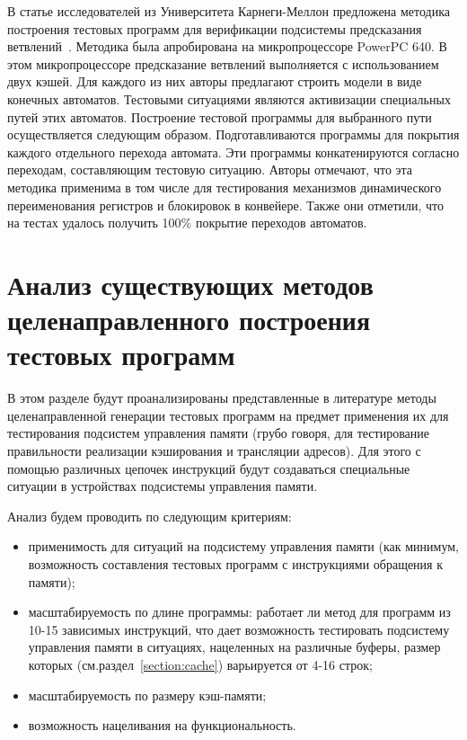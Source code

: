 В статье исследователей из Университета Карнеги-Меллон предложена методика построения тестовых программ для верификации подсистемы предсказания ветвлений~\cite{Branches99}. Методика была апробирована на микропроцессоре PowerPC 640. В этом микропроцессоре предсказание ветвлений выполняется с использованием двух кэшей. Для каждого из них авторы предлагают строить модели в виде конечных автоматов. Тестовыми ситуациями являются активизации специальных путей этих автоматов. Построение тестовой программы для выбранного пути осуществляется следующим образом. Подготавливаются программы для покрытия каждого отдельного перехода автомата. Эти программы конкатенируются согласно переходам, составляющим тестовую ситуацию. Авторы отмечают, что эта методика применима в том числе для тестирования механизмов динамического переименования регистров и блокировок в конвейере. Также они отметили, что на тестах удалось получить 100\% покрытие переходов автоматов.


\section{Анализ существующих методов целенаправленного построения  тестовых программ}

В этом разделе будут проанализированы представленные в литературе методы целенаправленной генерации тестовых программ на предмет применения их для тестирования подсистем управления памяти (грубо говоря, для тестирование правильности реализации кэширования и трансляции адресов). Для этого с помощью различных цепочек инструкций будут создаваться специальные ситуации в устройствах подсистемы управления памяти.

Анализ будем проводить по следующим критериям:
\begin{itemize}
	\item применимость для ситуаций на подсистему управления памяти (как минимум, возможность составления тестовых программ с инструкциями обращения к памяти);
	\item масштабируемость по длине программы: работает ли метод для программ из 10-15 зависимых инструкций, что дает возможность тестировать подсистему управления памяти в ситуациях, нацеленных на различные буферы, размер которых (см.раздел~\ref{section:cache}) варьируется от 4-16 строк;
	\item масштабируемость по размеру кэш-памяти;
	\item возможность нацеливания на функциональность.
\end{itemize}

